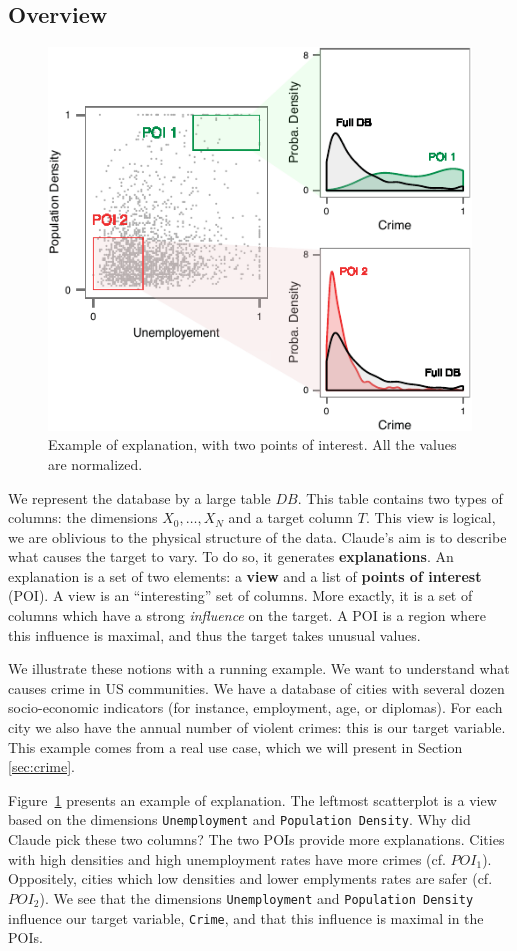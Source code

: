 \subsection{Overview}
\begin{figure}[t!]
\centering
\includegraphics[width=0.8\columnwidth]{images/Overview}
\caption{Example of explanation, with two points of interest. All the values
are normalized.}
\label{fig:overview}
\end{figure}
We represent the database by a large table $DB$. This table contains two types
of columns: the dimensions $X_0, \ldots, X_N$ and a target column $T$. This
view is logical, we are oblivious to the physical structure of the data.
Claude's aim is to describe what causes the target to vary. To do so, it
generates \textbf{explanations}.  An explanation is a set of two elements: a
\textbf{view} and a list of \textbf{points of interest} (POI). A view is an
``interesting'' set of columns.  More exactly, it is a set of columns which
have a strong \emph{influence} on the target. A POI is a region where this
influence is maximal, and thus the target takes unusual values.

We illustrate these notions with a running example. We want to understand what
causes crime in US communities. We have a database of cities with several dozen
socio-economic indicators (for instance, employment, age, or diplomas). For
each city we also have the annual number of violent crimes: this is our target
variable. This example comes from a real use case, which we will
present in Section \ref{sec:crime}.

Figure~\ref{fig:overview} presents an example of explanation. The leftmost
scatterplot is a view based on the dimensions \texttt{Unemployment} and
\texttt{Population Density}. Why did Claude pick these two columns? The two
POIs provide more explanations. Cities with high densities and high
unemployment rates have more crimes (cf. $POI_1$). Oppositely, cities which low
densities and lower emplyments rates are safer (cf. $POI_2$). We see that the
dimensions \texttt{Unemployment} and \texttt{Population Density} influence our
target variable, \texttt{Crime}, and that this influence is maximal in the
POIs.

